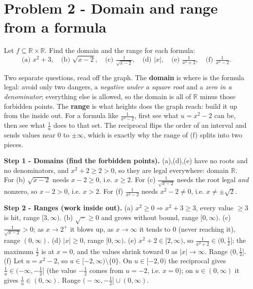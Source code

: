 \documentclass[11pt,a4paper]{article}
\newcommand{\R}{\mathbb{R}}
\begin{document}
\section*{Problem 2 - Domain and range from a formula}

\begin{problembox}[2]
Let $f\subseteq\R\times\R$. Find the domain and the range for each formula:
\[
\text{(a) } x^2+3,\quad
\text{(b) } \sqrt{x-2},\quad
\text{(c) } \tfrac{1}{\sqrt{x-2}},\quad
\text{(d) } |x|,\quad
\text{(e) } \tfrac{1}{x^2+2},\quad
\text{(f) } \tfrac{1}{x^2-2}.
\]
\end{problembox}

\begin{ideabox}
Two separate questions, read off the graph. The \textbf{domain} is \textquotedbl{}where is the
formula legal\textquotedbl{}: avoid only two dangers, a \emph{negative under a square root} and a
\emph{zero in a denominator}; everything else is allowed, so the domain is all of $\R$ minus those
forbidden points. The \textbf{range} is \textquotedbl{}what heights does the graph reach\textquotedbl{}:
build it up from the inside out. For a formula like $\tfrac{1}{x^2-2}$, first see what
$u=x^2-2$ can be, then see what $\tfrac1u$ does to that set. The reciprocal flips the order of an
interval and sends values near $0$ to $\pm\infty$, which is exactly why the range of (f) splits
into two pieces.
\end{ideabox}

\textbf{Step 1 - Domains (find the forbidden points).}
(a),(d),(e) have no roots and no denominators, and $x^2+2\ge2>0$, so they are legal everywhere:
domain $\R$. For (b) $\sqrt{x-2}$ needs $x-2\ge0$, i.e. $x\ge2$. For (c) $\tfrac1{\sqrt{x-2}}$ needs
the root legal \emph{and} nonzero, so $x-2>0$, i.e. $x>2$. For (f) $\tfrac1{x^2-2}$ needs
$x^2-2\ne0$, i.e. $x\ne\pm\sqrt2$.

\textbf{Step 2 - Ranges (work inside out).}
(a) $x^2\ge0\Rightarrow x^2+3\ge3$, every value $\ge3$ is hit, range $[3,\infty)$.
(b) $\sqrt{\,\cdot\,}\ge0$ and grows without bound, range $[0,\infty)$.
(c) $\tfrac1{\sqrt{x-2}}>0$; as $x\to2^+$ it blows up, as $x\to\infty$ it tends to $0$ (never
reaching it), range $(0,\infty)$.
(d) $|x|\ge0$, range $[0,\infty)$.
(e) $x^2+2\in[2,\infty)$, so $\tfrac1{x^2+2}\in(0,\tfrac12]$; the maximum $\tfrac12$ is at $x=0$,
and the values shrink toward $0$ as $|x|\to\infty$. Range $\bigl(0,\tfrac12\bigr]$.
(f) Let $u=x^2-2$, so $u\in[-2,\infty)\setminus\{0\}$. On $u\in[-2,0)$ the reciprocal gives
$\tfrac1u\in(-\infty,-\tfrac12]$ (the value $-\tfrac12$ comes from $u=-2$, i.e. $x=0$); on
$u\in(0,\infty)$ it gives $\tfrac1u\in(0,\infty)$. Range
$\bigl(-\infty,-\tfrac12\bigr]\cup(0,\infty)$.
\end{document}
